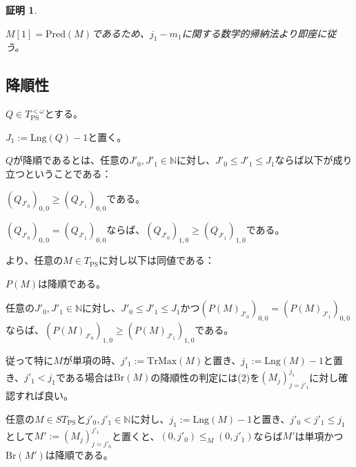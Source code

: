 \documentclass[dvipdfmx,uplatex]{jsarticle}
\theoremstyle{customnonumberbreakfortheorem}
\theoremstyle{customnonumberbreakforproof}
\newtheorem{hideableproof}{証明}
\begin{document}
\begin{hideableproof}
	\begin{indented}
		\item \(M[1] = \textrm{Pred}(M)\)であるため、\(j_1-m_1\)に関する数学的帰納法より即座に従う。
	\end{indented}
\end{hideableproof}


\subsection{降順性}

\(Q \in T_{\textrm{PS}}^{< \omega}\)とする。
\begin{nenumerate}
	\item \(J_1 := \textrm{Lng}(Q)-1\)と置く。
	\item \(Q\)が降順であるとは、任意の\(J'_0,J'_1 \in \mathbb{N}\)に対し、\(J'_0 \leq J'_1 \leq J_1\)ならば以下が成り立つということである：
	\begin{nenumerate}
		\item \((Q_{J'_0})_{0,0} \geq (Q_{J'_1})_{0,0}\)である。
		\item \((Q_{J'_0})_{0,0} = (Q_{J'_1})_{0,0}\)ならば、\((Q_{J'_0})_{1,0} \geq (Q_{J'_1})_{1,0}\)である。
	\end{nenumerate}
\end{nenumerate}

より、任意の\(M \in T_{\textrm{PS}}\)に対し以下は同値である：
\begin{penumerate}
	\item \(P(M)\)は降順である。
	\item 任意の\(J'_0,J'_1 \in \mathbb{N}\)に対し、\(J'_0 \leq J'_1 \leq J_1\)かつ\((P(M)_{J'_0})_{0,0} = (P(M)_{J'_1})_{0,0}\)ならば、\((P(M)_{J'_0})_{1,0} \geq (P(M)_{J'_1})_{1,0}\)である。
\end{penumerate}
従って特に\(M\)が単項の時、\(j'_1 := \textrm{TrMax}(M)\)と置き、\(j_1 := \textrm{Lng}(M)-1\)と置き、\(j'_1 < j_1\)である場合は\(\textrm{Br}(M)\)の降順性の判定には(2)を\((M_j)_{j=j'_1}^{j_1}\)に対し確認すれば良い。

\begin{proposition}\label{標準形の切片とBrの降順性の関係}
	任意の\(M \in ST_{\textrm{PS}}\)と\(j'_0,j'_1 \in \mathbb{N}\)に対し、\(j_1 := \textrm{Lng}(M)-1\)と置き、\(j'_0 < j'_1 \leq j_1\)として\(M' := (M_j)_{j=j'_0}^{j'_1}\)と置くと、\((0,j'_0) \leq_M (0,j'_1)\)ならば\(M'\)は単項かつ\(\textrm{Br}(M')\)は降順である。
\end{proposition}
\end{document}
